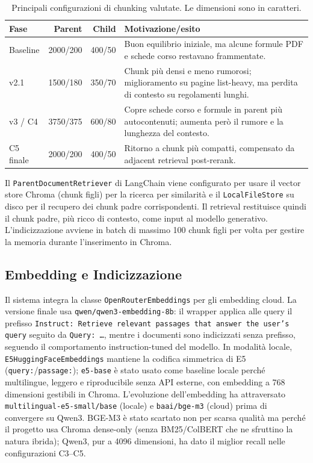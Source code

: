 \documentclass[11pt,a4paper]{article}
\newcommand{\code}[1]{\texttt{\small#1}}
\begin{document}
\begin{table}[htbp]
\centering
\caption{Principali configurazioni di chunking valutate. Le dimensioni sono in caratteri.}
\label{tab:chunking}
\small
\begin{tabularx}{\textwidth}{lrrX}
\toprule
\textbf{Fase} & \textbf{Parent} & \textbf{Child} & \textbf{Motivazione/esito} \\
\midrule
Baseline & 2000/200 & 400/50 & Buon equilibrio iniziale, ma alcune formule PDF e schede corso restavano frammentate. \\
v2.1 & 1500/180 & 350/70 & Chunk più densi e meno rumorosi; miglioramento su pagine list-heavy, ma perdita di contesto su regolamenti lunghi. \\
v3 / C4 & 3750/375 & 600/80 & Copre schede corso e formule in parent più autocontenuti; aumenta però il rumore e la lunghezza del contesto. \\
C5 finale & 2000/200 & 400/50 & Ritorno a chunk più compatti, compensato da adjacent retrieval post-rerank. \\
\bottomrule
\end{tabularx}
\end{table}

Il \code{ParentDocumentRetriever} di LangChain viene configurato per usare il vector store
Chroma (chunk figli) per la ricerca per similarità e il \code{LocalFileStore} su disco
per il recupero dei chunk padre corrispondenti. Il retrieval restituisce quindi il chunk
padre, più ricco di contesto, come input al modello generativo. L'indicizzazione avviene
in batch di massimo 100 chunk figli per volta per gestire la memoria durante l'inserimento
in Chroma.

\subsection{Embedding e Indicizzazione}

Il sistema integra la classe \code{OpenRouterEmbeddings} per gli embedding cloud. La
versione finale usa \texttt{qwen/qwen3-embedding-8b}: il wrapper applica alle query il
prefisso \texttt{Instruct: Retrieve relevant passages that answer the user's query} seguito
da \texttt{Query: \ldots}, mentre i documenti sono indicizzati senza prefisso, seguendo il
comportamento instruction-tuned del modello. In modalità locale, \code{E5HuggingFaceEmbeddings}
mantiene la codifica simmetrica di E5 (\texttt{query:}/\texttt{passage:}); \texttt{e5-base}
è stato usato come baseline locale perché multilingue, leggero e riproducibile senza API
esterne, con embedding a 768 dimensioni gestibili in Chroma. L'evoluzione
dell'embedding ha attraversato \texttt{multilingual-e5-small/base} (locale) e
\texttt{baai/bge-m3} (cloud) prima di convergere su Qwen3. BGE-M3 è stato scartato non per
scarsa qualità ma perché il progetto usa Chroma dense-only (senza BM25/ColBERT che ne
sfruttino la natura ibrida); Qwen3, pur a 4096 dimensioni, ha dato il miglior recall nelle
configurazioni C3--C5.
\end{document}
